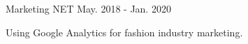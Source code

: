 

\begin{cventries}

  \cventry
    {Marketing} %
    {\color{gray}NET}
    {}
    {May. 2018 - Jan. 2020} %
    {
      \begin{cvitems} %
        \item {Using Google Analytics for fashion industry marketing.} 
      \end{cvitems}
    }
\end{cventries}
